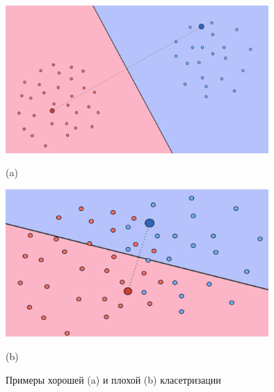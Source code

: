    \begin{figure}[!ht]
      \begin{center}
          
      \includegraphics[width=10cm]{Images/good_clustering.png}
      \caption*{(a)}
      
      \includegraphics[width=10cm]{Images/poor_clustering.png}
      \caption*{(b)}      
      
      \end{center}
    \caption{Примеры хорошей (a) и плохой (b) класетризации}
    \label{fig:ClusteringGoodPoor}
    \end{figure}
    
